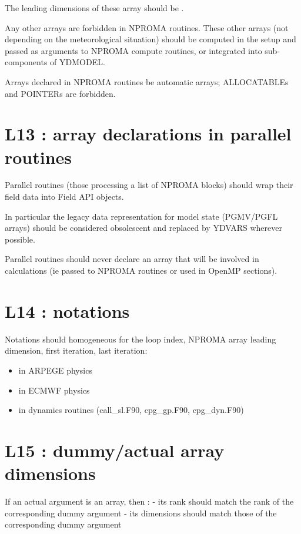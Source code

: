 \documentclass[letterpaper,10pt,english]{sphinxmanual}
\begin{document}
The leading dimensions of these array should be .

Any other arrays are forbidden in NPROMA routines. These other arrays (not depending on
the meteorological situation) should be computed in the setup and passed as arguments
to NPROMA compute routines, or integrated into sub-components of YDMODEL.

Arrays declared in NPROMA routines be automatic arrays; ALLOCATABLEs and POINTERs are
forbidden.


\section{L13 : array declarations in parallel routines}
\label{\detokenize{rules/L13:l13-array-declarations-in-parallel-routines}}\label{\detokenize{rules/L13::doc}}
Parallel routines (those processing a list of NPROMA blocks) should wrap their field data
into Field API objects.

In particular the legacy data representation for model state (PGMV/PGFL arrays) should be
considered obsolescent and replaced by YDVARS wherever possible.

Parallel routines should never declare an array that will be involved in calculations
(ie passed to NPROMA routines or used in OpenMP sections).


\section{L14 : notations}
\label{\detokenize{rules/L14:l14-notations}}\label{\detokenize{rules/L14::doc}}
Notations should homogeneous for the loop index, NPROMA array leading dimension, first iteration, last iteration:
\begin{itemize}
\item {} 
 in ARPEGE physics

\item {} 
 in ECMWF physics

\item {} 
 in dynamics routines (call\_sl.F90, cpg\_gp.F90, cpg\_dyn.F90)

\end{itemize}


\section{L15 : dummy/actual array dimensions}
\label{\detokenize{rules/L15:l15-dummy-actual-array-dimensions}}\label{\detokenize{rules/L15::doc}}
If an actual argument is an array, then :
- its rank should match the rank of the corresponding dummy argument
- its dimensions should match those of the corresponding dummy argument
\end{document}
